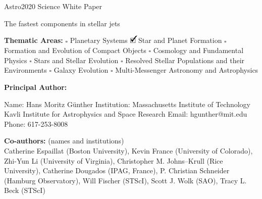 \documentclass[12pt]{article}
\newcommand{\cmark}{\ding{51}}%
\newcommand{\done}{\rlap{$\square$}{\raisebox{2pt}{\large\hspace{1pt}\cmark}}%
\hspace{-2.5pt}}
\begin{document}
\raggedright
\huge
Astro2020 Science White Paper \linebreak

The fastest components in stellar jets \linebreak
\normalsize

\noindent \textbf{Thematic Areas:} \hspace*{60pt} $\square$ Planetary Systems \hspace*{10pt} $\done$ Star and Planet Formation \hspace*{20pt}\linebreak
$\square$ Formation and Evolution of Compact Objects \hspace*{31pt} $\square$ Cosmology and Fundamental Physics \linebreak
  $\square$  Stars and Stellar Evolution \hspace*{1pt} $\square$ Resolved Stellar Populations and their Environments \hspace*{40pt} \linebreak
  $\square$    Galaxy Evolution   \hspace*{45pt} $\square$             Multi-Messenger Astronomy and Astrophysics \hspace*{65pt} \linebreak
  
\textbf{Principal Author:}

Name:	Hans Moritz G\"unther
 \linebreak						
Institution: Massachusetts Institute of Technology
Kavli Institute for Astrophysics and Space Research 
 \linebreak
Email: hgunther@mit.edu
 \linebreak
Phone:  617-253-8008
 \linebreak
 
\textbf{Co-authors:} (names and institutions)\\
Catherine Espaillat (Boston University),
Kevin France (University of Colorado),
Zhi-Yun Li (University of Virginia), Christopher M. Johns--Krull (Rice University), Catherine Dougados (IPAG, France),
P. Christian Schneider (Hamburg Observatory), Will Fischer (STScI), Scott J. Wolk (SAO), Tracy L. Beck (STScI)
  \linebreak
\end{document}
